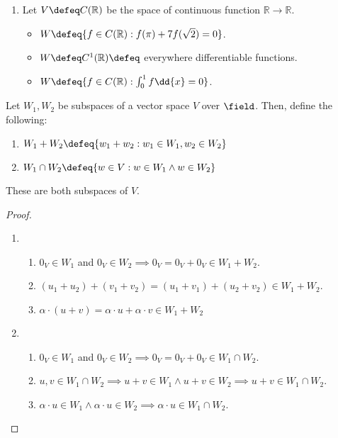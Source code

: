 \begin{example}
\begin{enumerate}
        \item Let $V \defeq C(\mathbb{R})$ be the space of continuous function $\mathbb{R} \to \mathbb{R}$.
        \begin{itemize}
            \item $W \defeq \{f \in C(\mathbb{R}) : f(\pi) + 7 f(\sqrt{2}) = 0 \}$.
            \item $W \defeq C^1(\mathbb{R}) \defeq$ everywhere differentiable functions.
            \item $W\defeq \{ f \in C(\mathbb{R}) : \int_0^1 f \dd{x} = 0\}$.
        \end{itemize}
    \end{enumerate}
\end{example}

\begin{proposition}
    Let $W_1, W_2$ be subspaces of a vector space $V$ over $\field$. Then, define the following:
    \begin{enumerate}
        \item $W_1 + W_2 \defeq \{w_1 + w_2 : w_1 \in W_1, w_2 \in W_2\}$
        \item $W_1 \cap W_2\defeq \{w \in V : w \in W_1 \wedge w \in W_2\}$
    \end{enumerate}
    These are both subspaces of $V$.
\end{proposition}

\begin{proof}
    \begin{enumerate}
        \item \begin{enumerate}
            \item $0_V \in W_1$ and $0_V \in W_2 \implies 0_V = 0_V + 0_V \in W_1 + W_2$.
            \item $(u_1 +u_2) + (v_1 + v_2) = (u_1 + v_1) + (u_2 + v_2) \in W_1 + W_2$.
            \item $\alpha \cdot (u + v) = \alpha \cdot u + \alpha \cdot v \in W_1 + W_2$
        \end{enumerate}
        \item \begin{enumerate}
            \item $0_V \in W_1$ and $0_V \in W_2 \implies 0_V = 0_V + 0_V \in W_1 \cap W_2$.
            \item $u, v \in W_1 \cap W_2 \implies u + v \in W_1 \wedge u+v \in W_2 \implies u + v \in W_1 \cap W_2$.
            \item $\alpha \cdot u \in W_1 \wedge \alpha \cdot u \in W_2 \implies \alpha \cdot u \in W_1 \cap W_2$.
        \end{enumerate}
    \end{enumerate}
\end{proof}

